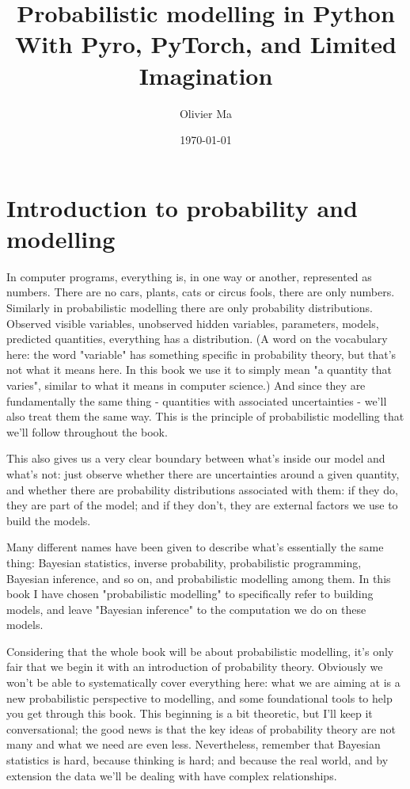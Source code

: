 \documentclass[11pt]{article}
\author{Olivier Ma}
\date{\today}
\title{Probabilistic modelling in Python\\\medskip
\large With Pyro, PyTorch, and Limited Imagination}
\begin{document}
\maketitle
\tableofcontents


\section{Introduction to probability and modelling}
\label{sec:orgbbe43be}
In computer programs, everything is, in one way or another, represented as numbers. There are no cars, plants, cats or circus fools, there are only numbers. Similarly in probabilistic modelling there are only probability distributions. Observed visible variables, unobserved hidden variables, parameters, models, predicted quantities, everything has a distribution. (A word on the vocabulary here: the word "variable" has something specific in probability theory, but that's not what it means here. In this book we use it to simply mean "a quantity that varies", similar to what it means in computer science.) And since they are fundamentally the same thing - quantities with associated uncertainties - we'll also treat them the same way. This is the principle of probabilistic modelling that we'll follow throughout the book.

This also gives us a very clear boundary between what's inside our model and what's not: just observe whether there are uncertainties around a given quantity, and whether there are probability distributions associated with them: if they do, they are part of the model; and if they don't, they are external factors we use to build the models.

Many different names have been given to describe what's essentially the same thing: Bayesian statistics, inverse probability, probabilistic programming, Bayesian inference, and so on, and probabilistic modelling among them. In this book I have chosen "probabilistic modelling" to specifically refer to building models, and leave "Bayesian inference" to the computation we do on these models.

Considering that the whole book will be about probabilistic modelling, it's only fair that we begin it with an introduction of probability theory. Obviously we won't be able to systematically cover everything here: what we are aiming at is a new probabilistic perspective to modelling, and some foundational tools to help you get through this book. This beginning is a bit theoretic, but I'll keep it conversational; the good news is that the key ideas of probability theory are not many and what we need are even less. Nevertheless, remember that Bayesian statistics is hard, because thinking is hard; and because the real world, and by extension the data we'll be dealing with have complex relationships. 
\end{document}
